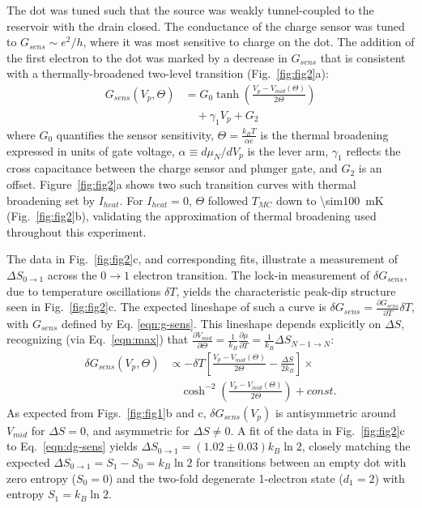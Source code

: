 \documentclass[twocolumn,showpacs,amsmath,amssymb,prl,aps,superscriptaddress]{revtex4-1}
\begin{document}
The dot was tuned such that the source was weakly tunnel-coupled to the reservoir with the drain closed.  The conductance of the charge sensor was tuned to $G_{sens}{\sim}e^2/h$, where it was most sensitive to charge on the dot.  The addition of the first electron to the dot was marked by a decrease in $G_{sens}$ that is consistent with a thermally-broadened two-level transition (Fig.~\ref{fig:fig2}a):
%
\begin{align}
\label{eqn:g-sens}
        G_{sens}(V_p,\Theta) &= G_0 \tanh\left(\frac{V_p - V_{mid}(\Theta)}{2\Theta}\right)  \\
                        &\quad + \gamma_1 V_{p} + G_2 \nonumber
\end{align}
%
where $G_0$ quantifies the sensor sensitivity, $\Theta = \frac{k_B T}{\alpha e}$ is the thermal broadening expressed in units of gate voltage, $\alpha\equiv d \mu_{N}/d V_p$ is the lever arm,  $\gamma_1$ reflects the cross capacitance between the charge sensor and plunger gate, and $G_2$ is an offset. Figure~\ref{fig:fig2}a shows two such transition curves with thermal broadening set by $I_{heat}$. For $I_{heat}=0$, $\Theta$ followed $T_{MC}$ down to \SI{\sim100}{\milli\kelvin} (Fig.~\ref{fig:fig2}b), validating the approximation of thermal broadening used throughout this experiment.

The data in Fig.~\ref{fig:fig2}c, and corresponding fits, illustrate a measurement of $\Delta S_{0\rightarrow 1}$ across the $0 \rightarrow 1$ electron transition. The lock-in measurement of $\delta G_{sens}$, due to temperature oscillations $\delta T$, yields the characteristic peak-dip structure seen in Fig.~\ref{fig:fig2}c.
The expected lineshape of such a curve is $\delta G_{sens} = \frac{\partial G_{sens}}{\partial T} \delta T$, with $G_{sens}$ defined by Eq. \ref{eqn:g-sens}.  This lineshape depends explicitly on $\Delta S$, recognizing (via Eq.~\ref{eqn:max}) that $\frac{\partial V_{mid}}{\partial \Theta}=\frac{1}{k_B}\frac{\partial \mu}{\partial T} =\frac{1}{k_B}\Delta S_{N-1\rightarrow N}$:
%
\begin{align}
\label{eqn:dg-sens}
        \delta G_{sens}(V_p, \Theta) &\propto -\delta T \left[ \frac{V_p - V_{mid}(\Theta)}{2\Theta} - \frac{\Delta S}{2k_B} \right]\times \\
        				      &\quad\cosh^{-2}\left(\frac{V_p - V_{mid}(\Theta)}{2\Theta}\right) + const. \nonumber
\end{align}
%
\noindent As expected  from Figs.~\ref{fig:fig1}b and c, $\delta G_{sens}(V_p)$ is antisymmetric around $V_{mid}$ for $\Delta S=0$, and asymmetric for $\Delta S\neq 0$.  A fit of the data in Fig.~\ref{fig:fig2}c to Eq.~\ref{eqn:dg-sens} yields $\Delta S_{0\rightarrow 1}=(1.02 \pm 0.03) k_B \ln{2}$, closely matching the expected $\Delta S_{0 \rightarrow 1} = S_1 - S_0 =k_B\ln{2}$ for transitions between an empty dot with zero entropy ($S_0=0$) and the two-fold degenerate 1-electron state ($d_1=2$) with entropy $S_1=k_B \ln{2}$.
\end{document}
